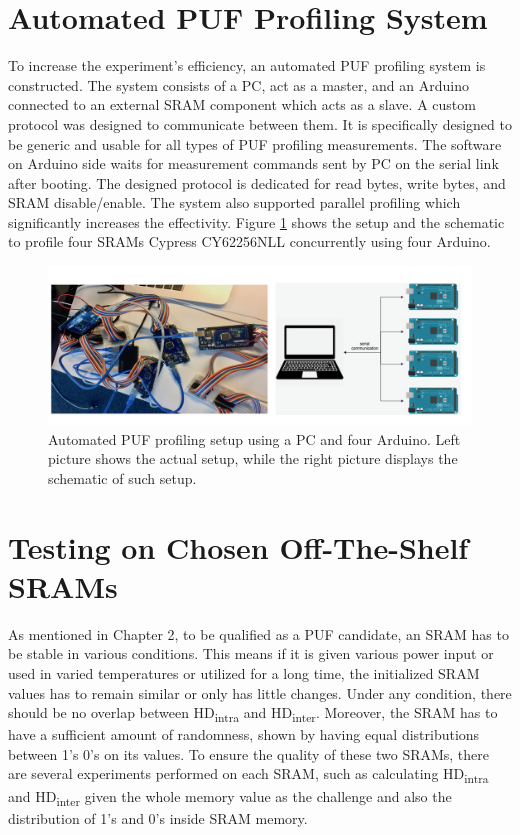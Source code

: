 \section{Automated PUF Profiling System}
To increase the experiment's efficiency, an automated PUF profiling system is constructed. The system consists of a PC, act as a master, and an Arduino connected to an external SRAM component which acts as a slave. A custom protocol was designed to communicate between them. It is specifically designed to be generic and usable for all types of PUF profiling measurements. The software on Arduino side waits for measurement commands sent by PC on the serial link after booting. The designed protocol is dedicated for read bytes, write bytes, and SRAM disable/enable. The system also supported parallel profiling which significantly increases the effectivity. Figure \ref{fig:puf_profiling} shows the setup and the schematic to profile four SRAMs Cypress CY62256NLL concurrently using four Arduino.

\begin{figure}[tph!]
    \centerline{\includegraphics[width={\textwidth}]{images/setup}}
    \caption{Automated PUF profiling setup using a PC and four Arduino. Left picture shows the actual setup, while the right picture displays the schematic of such setup.}
    \label{fig:puf_profiling}
\end{figure}

\section{Testing on Chosen Off-The-Shelf SRAMs}

As mentioned in Chapter 2, to be qualified as a PUF candidate, an SRAM has to be stable in various conditions. This means if it is given various power input or used in varied temperatures or utilized for a long time, the initialized SRAM values has to remain similar or only has little changes. Under any condition, there should be no overlap between HD\textsubscript{intra} and HD\textsubscript{inter}. Moreover, the SRAM has to have a sufficient amount of randomness, shown by having equal distributions between 1's 0's on its values.  To ensure the quality of these two SRAMs, there are several experiments performed on each SRAM, such as calculating HD\textsubscript{intra} and HD\textsubscript{inter} given the whole memory value as the challenge and also the distribution of 1's and 0's inside SRAM memory.

